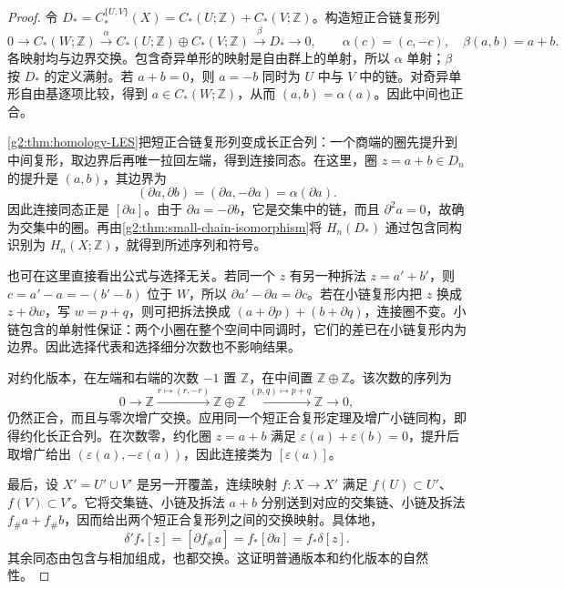 \begin{proof}
	令 \(D_*=C_*^{\{U,V\}}(X)=C_*(U;\mathbb Z)+C_*(V;\mathbb Z)\)。构造短正合链复形列
	\begin{equation}\label{g2:eq:mayer-vietoris-short-exact}
		0\longrightarrow C_*(W;\mathbb Z)
		\xrightarrow{\ \alpha\ }
		C_*(U;\mathbb Z)\oplus C_*(V;\mathbb Z)
		\xrightarrow{\ \beta\ }D_*
		\longrightarrow0,
		\qquad
		\alpha(c)=(c,-c),\quad\beta(a,b)=a+b.
	\end{equation}
	各映射均与边界交换。包含奇异单形的映射是自由群上的单射，所以 \(\alpha\) 单射；\(\beta\) 按 \(D_*\) 的定义满射。若 \(a+b=0\)，则 \(a=-b\) 同时为 \(U\) 中与 \(V\) 中的链。对奇异单形自由基逐项比较，得到 \(a\in C_*(W;\mathbb Z)\)，从而 \((a,b)=\alpha(a)\)。因此中间也正合。

	\cref{g2:thm:homology-LES}把短正合链复形列变成长正合列：一个商端的圈先提升到中间复形，取边界后再唯一拉回左端，得到连接同态。在这里，圈 \(z=a+b\in D_n\) 的提升是 \((a,b)\)，其边界为
	\[
		(\partial a,\partial b)=(\partial a,-\partial a)
		=\alpha(\partial a).
	\]
	因此连接同态正是 \([\partial a]\)。由于 \(\partial a=-\partial b\)，它是交集中的链，而且 \(\partial^2a=0\)，故确为交集中的圈。再由\cref{g2:thm:small-chain-isomorphism}将 \(H_n(D_*)\) 通过包含同构识别为 \(H_n(X;\mathbb Z)\)，就得到所述序列和符号。

	也可在这里直接看出公式与选择无关。若同一个 \(z\) 有另一种拆法 \(z=a'+b'\)，则 \(c=a'-a=-(b'-b)\) 位于 \(W\)，所以 \(\partial a'-\partial a=\partial c\)。若在小链复形内把 \(z\) 换成 \(z+\partial w\)，写 \(w=p+q\)，则可把拆法换成 \((a+\partial p)+(b+\partial q)\)，连接圈不变。小链包含的单射性保证：两个小圈在整个空间中同调时，它们的差已在小链复形内为边界。因此选择代表和选择细分次数也不影响结果。

	对约化版本，在左端和右端的次数 \(-1\) 置 \(\mathbb Z\)，在中间置 \(\mathbb Z\oplus\mathbb Z\)。该次数的序列为
	\[
		0\longrightarrow\mathbb Z
		\xrightarrow{r\mapsto(r,-r)}
		\mathbb Z\oplus\mathbb Z
		\xrightarrow{(p,q)\mapsto p+q}
		\mathbb Z\longrightarrow0,
	\]
	仍然正合，而且与零次增广交换。应用同一个短正合复形定理及增广小链同构，即得约化长正合列。在次数零，约化圈 \(z=a+b\) 满足 \(\varepsilon(a)+\varepsilon(b)=0\)，提升后取增广给出 \((\varepsilon(a),-\varepsilon(a))\)，因此连接类为 \([\varepsilon(a)]\)。

	最后，设 \(X'=U'\cup V'\) 是另一开覆盖，连续映射 \(f:X\to X'\) 满足 \(f(U)\subset U'\)、\(f(V)\subset V'\)。它将交集链、小链及拆法 \(a+b\) 分别送到对应的交集链、小链及拆法 \(f_\#a+f_\#b\)，因而给出两个短正合复形列之间的交换映射。具体地，
	\[
		\delta' f_*[z]=[\partial f_\#a]
		=f_*[\partial a]=f_*\delta[z].
	\]
	其余同态由包含与相加组成，也都交换。这证明普通版本和约化版本的自然性。
\end{proof}

